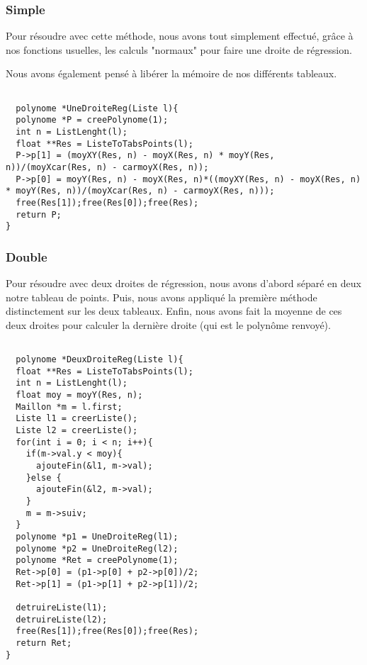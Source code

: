 \documentclass[letter]{article}
\begin{document}
\subsubsection{Simple}
\label{sec:org66ed61c}
Pour résoudre avec cette méthode, nous avons tout simplement effectué, grâce à nos fonctions usuelles, les calculs "normaux" pour faire une droite de régression.

Nous avons également pensé à libérer la mémoire de nos différents tableaux.

\begin{verbatim}

  polynome *UneDroiteReg(Liste l){
  polynome *P = creePolynome(1);
  int n = ListLenght(l);
  float **Res = ListeToTabsPoints(l);
  P->p[1] = (moyXY(Res, n) - moyX(Res, n) * moyY(Res, n))/(moyXcar(Res, n) - carmoyX(Res, n));
  P->p[0] = moyY(Res, n) - moyX(Res, n)*((moyXY(Res, n) - moyX(Res, n) * moyY(Res, n))/(moyXcar(Res, n) - carmoyX(Res, n)));
  free(Res[1]);free(Res[0]);free(Res);
  return P;
}

\end{verbatim}

\subsubsection{Double}
\label{sec:org2a366b0}

Pour résoudre avec deux droites de régression, nous avons d'abord séparé en deux notre tableau de points. Puis, nous avons appliqué la première méthode distinctement sur les deux tableaux. Enfin, nous avons fait la moyenne de ces deux droites pour calculer la dernière droite (qui est le polynôme renvoyé).

\begin{verbatim}

  polynome *DeuxDroiteReg(Liste l){
  float **Res = ListeToTabsPoints(l);
  int n = ListLenght(l);
  float moy = moyY(Res, n);
  Maillon *m = l.first;
  Liste l1 = creerListe();
  Liste l2 = creerListe();
  for(int i = 0; i < n; i++){
    if(m->val.y < moy){
      ajouteFin(&l1, m->val);
    }else {
      ajouteFin(&l2, m->val);
    }
    m = m->suiv;
  }
  polynome *p1 = UneDroiteReg(l1);
  polynome *p2 = UneDroiteReg(l2);
  polynome *Ret = creePolynome(1);
  Ret->p[0] = (p1->p[0] + p2->p[0])/2;
  Ret->p[1] = (p1->p[1] + p2->p[1])/2;

  detruireListe(l1);
  detruireListe(l2);
  free(Res[1]);free(Res[0]);free(Res);
  return Ret;
}


\end{verbatim}
\end{document}
